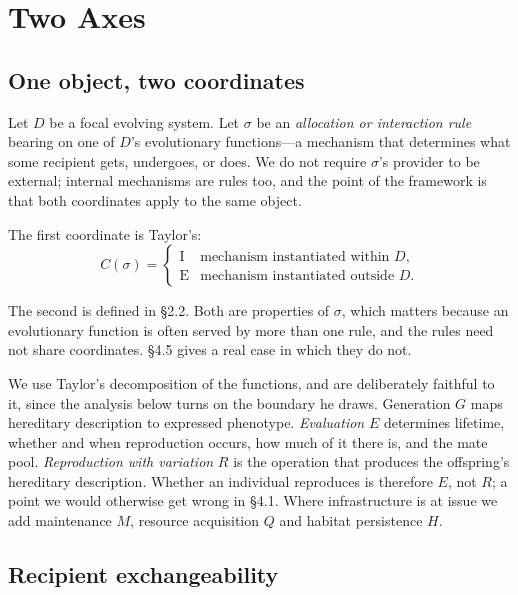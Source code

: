 \documentclass[review,3p,times]{elsarticle}
\begin{document}
\section{Two Axes}

\subsection{One object, two coordinates}

Let $D$ be a focal evolving system. Let $\sigma$ be an \emph{allocation or
interaction rule} bearing on one of $D$'s evolutionary functions---a
mechanism that determines what some recipient gets, undergoes, or does. We
do not require $\sigma$'s provider to be external; internal mechanisms are
rules too, and the point of the framework is that both coordinates apply to
the same object.

The first coordinate is Taylor's:
\begin{equation}
C(\sigma)=
\begin{cases}
\mathrm{I} & \text{mechanism instantiated within } D,\\
\mathrm{E} & \text{mechanism instantiated outside } D .
\end{cases}
\end{equation}

The second is defined in \S2.2. Both are properties of $\sigma$, which
matters because an evolutionary function is often served by more than one
rule, and the rules need not share coordinates. \S4.5 gives a real case in
which they do not.

We use Taylor's decomposition of the functions, and are deliberately
faithful to it, since the analysis below turns on the boundary he draws.
Generation $G$ maps hereditary description to expressed phenotype.
\emph{Evaluation} $E$ determines lifetime, whether and when reproduction
occurs, how much of it there is, and the mate pool. \emph{Reproduction with
variation} $R$ is the operation that produces the offspring's hereditary
description. Whether an individual reproduces is therefore $E$, not $R$; a
point we would otherwise get wrong in \S4.1. Where infrastructure is at
issue we add maintenance $M$, resource acquisition $Q$ and habitat
persistence $H$.

\subsection{Recipient exchangeability}
\end{document}
